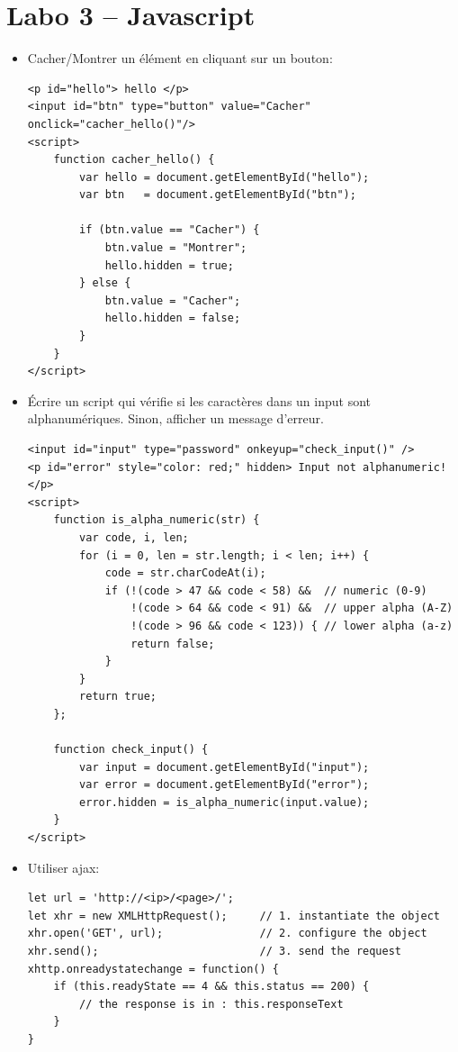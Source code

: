 \documentclass[a4paper]{article}
\begin{document}
\section{Labo 3 -- Javascript}





\begin{itemize}


\item Cacher/Montrer un élément en cliquant sur un bouton:
\begin{lstlisting}[style=javascript]
<p id="hello"> hello </p>
<input id="btn" type="button" value="Cacher" onclick="cacher_hello()"/>
<script>
    function cacher_hello() {
        var hello = document.getElementById("hello");
        var btn   = document.getElementById("btn");

        if (btn.value == "Cacher") {
            btn.value = "Montrer";
            hello.hidden = true;
        } else {
            btn.value = "Cacher";
            hello.hidden = false;
        }
    }
</script>
\end{lstlisting}


\item Écrire un script qui vérifie si les caractères dans un input sont alphanumériques. Sinon, afficher un message d'erreur.
\begin{lstlisting}[style=javascript]
<input id="input" type="password" onkeyup="check_input()" />
<p id="error" style="color: red;" hidden> Input not alphanumeric! </p>
<script>
    function is_alpha_numeric(str) {
        var code, i, len;
        for (i = 0, len = str.length; i < len; i++) {
            code = str.charCodeAt(i);
            if (!(code > 47 && code < 58) &&  // numeric (0-9)
                !(code > 64 && code < 91) &&  // upper alpha (A-Z)
                !(code > 96 && code < 123)) { // lower alpha (a-z)
                return false;
            }
        }
        return true;
    };

    function check_input() {
        var input = document.getElementById("input");
        var error = document.getElementById("error");
        error.hidden = is_alpha_numeric(input.value);
    }
</script>
\end{lstlisting}


\item Utiliser ajax:
\begin{lstlisting}[style=javascript]
let url = 'http://<ip>/<page>/';
let xhr = new XMLHttpRequest();     // 1. instantiate the object
xhr.open('GET', url);               // 2. configure the object
xhr.send();                         // 3. send the request
xhttp.onreadystatechange = function() {
    if (this.readyState == 4 && this.status == 200) {
        // the response is in : this.responseText
    }
}
\end{lstlisting}



\end{itemize}
\end{document}
